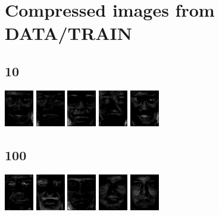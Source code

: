 \documentclass{article}
\begin{document}
\section{Compressed images from DATA/TRAIN}
\subsection{10}
\includegraphics{imgs/k10/out0.png}
\includegraphics{imgs/k10/out1.png}
\includegraphics{imgs/k10/out2.png}
\includegraphics{imgs/k10/out3.png}
\includegraphics{imgs/k10/out4.png}
\subsection{100}
\includegraphics{imgs/k100/out0.png}
\includegraphics{imgs/k100/out1.png}
\includegraphics{imgs/k100/out2.png}
\includegraphics{imgs/k100/out3.png}
\includegraphics{imgs/k100/out4.png}
\end{document}
